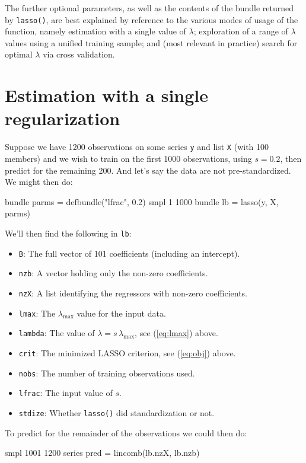 \documentclass{article}
\begin{document}
The further optional parameters, as well as the contents of the bundle
returned by \texttt{lasso()}, are best explained by reference to the
various modes of usage of the function, namely estimation with a
single value of $\lambda$; exploration of a range of $\lambda$ values
using a unified training sample; and (most relevant in practice)
search for optimal $\lambda$ via cross validation.

\section{Estimation with a single regularization}
\label{sec:single-lambda}

Suppose we have 1200 observations on some series \texttt{y} and list
\texttt{X} (with 100 members) and we wish to train on the first 1000
observations, using $s = 0.2$, then predict for the remaining
200. And let's say the data are not pre-standardized. We might then
do:
\begin{code}
bundle parms = defbundle("lfrac", 0.2)
smpl 1 1000
bundle lb = lasso(y, X, parms)
\end{code}
We'll then find the following in \texttt{lb}:
\begin{itemize}
\item \texttt{B}: The full vector of 101 coefficients (including an
  intercept).
\item \texttt{nzb}: A vector holding only the non-zero coefficients.
\item \texttt{nzX}: A list identifying the regressors with non-zero
  coefficients.
\item \texttt{lmax}: The $\lambda_{\max}$ value for the input data.
\item \texttt{lambda}: The value of $\lambda = s\,\lambda_{\max}$, see
  (\ref{eq:lmax}) above.
\item \texttt{crit}: The minimized LASSO criterion, see (\ref{eq:obj})
  above.
\item \texttt{nobs}: The number of training observations used.
\item \texttt{lfrac}: The input value of $s$.
\item \texttt{stdize}: Whether \texttt{lasso()} did standardization or
  not.
\end{itemize}

To predict for the remainder of the observations we could then do:
\begin{code}
smpl 1001 1200
series pred = lincomb(lb.nzX, lb.nzb)
\end{code}
\end{document}
